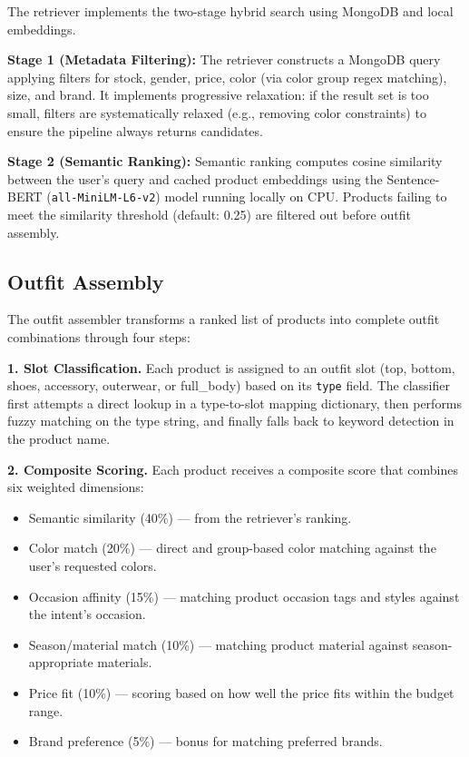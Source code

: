 The retriever implements the two-stage hybrid search using MongoDB and local embeddings.

\textbf{Stage 1 (Metadata Filtering):} The retriever constructs a MongoDB query applying filters for stock, gender, price, color (via color group regex matching), size, and brand. It implements progressive relaxation: if the result set is too small, filters are systematically relaxed (e.g., removing color constraints) to ensure the pipeline always returns candidates.

\textbf{Stage 2 (Semantic Ranking):} Semantic ranking computes cosine similarity between the user's query and cached product embeddings using the Sentence-BERT (\texttt{all-MiniLM-L6-v2}) model running locally on CPU. Products failing to meet the similarity threshold (default: 0.25) are filtered out before outfit assembly.

\subsection{Outfit Assembly}
\label{sec:impl-rag-outfit}

The outfit assembler transforms a ranked list of products into complete outfit combinations through four steps:

\textbf{1. Slot Classification.} Each product is assigned to an outfit slot (top, bottom, shoes, accessory, outerwear, or full\_body) based on its \texttt{type} field. The classifier first attempts a direct lookup in a type-to-slot mapping dictionary, then performs fuzzy matching on the type string, and finally falls back to keyword detection in the product name.

\textbf{2. Composite Scoring.} Each product receives a composite score that combines six weighted dimensions:

\begin{itemize}[leftmargin=*]
    \item Semantic similarity (40\%) --- from the retriever's ranking.
    \item Color match (20\%) --- direct and group-based color matching against the user's requested colors.
    \item Occasion affinity (15\%) --- matching product occasion tags and styles against the intent's occasion.
    \item Season/material match (10\%) --- matching product material against season-appropriate materials.
    \item Price fit (10\%) --- scoring based on how well the price fits within the budget range.
    \item Brand preference (5\%) --- bonus for matching preferred brands.
\end{itemize}

